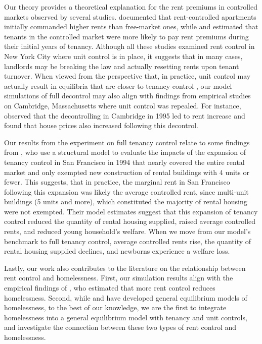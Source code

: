 \documentclass[parskip=full]{article}
\begin{document}
Our theory provides a theoretical explanation for the rent premiums in controlled markets observed by several studies. \citet{nagy-1997} documented that rent-controlled apartments initially commanded higher rents than free-market ones, while \citet{early-2000} and \citet{cjq-2023} estimated that tenants in the controlled market were more likely to pay rent premiums during their initial years of tenancy. Although all these studies examined rent control in New York City where unit control is in place, it suggests that in many cases, landlords may be breaking the law and actually resetting rents upon tenant turnover. When viewed from the perspective that, in practice, unit control may actually result in equilibria that are closer to tenancy control \citep{be-2000}, our model simulations of full decontrol may also align with findings from empirical studies on Cambridge, Massachusetts where unit control was repealed. For instance, \citet{sims-2007} observed that the decontrolling in Cambridge in 1995 led to rent increase and \citet{app-2014} found that house prices also increased following this decontrol. 

Our results from the experiment on full tenancy control relate to some findings from \citet{dmq-2019}, who use a structural model to evaluate the impacts of the expansion of tenancy control in San Francisco in 1994 that nearly covered the entire rental market and only exempted new construction of rental buildings with 4 units or fewer. This suggests, that in practice, the marginal rent in San Francisco following this expansion was likely the average controlled rent, since multi-unit buildings (5 units and more), which constituted the majority of rental housing were not exempted. Their model estimates suggest that this expansion of tenancy control reduced the quantity of rental housing supplied, raised average controlled rents, and reduced young household's welfare. When we move from our model's benchmark to full tenancy control, average controlled rents rise, the quantity of rental housing supplied declines, and newborns experience a welfare loss. 

Lastly, our work also contributes to the literature on the relationship between rent control and homelessness. First, our simulation results align with the empirical findings of \citet{eo-1998}, who estimated that more rent control reduces homelessness. Second, while \citet{az-2024} and \citet{abramson-2024} have developed general equilibrium models of homelessness, to the best of our knowledge, we are the first to integrate homelessness into a general equilibrium model with tenancy and unit controls, and investigate the connection between these two types of rent control and homelessness.
\end{document}
